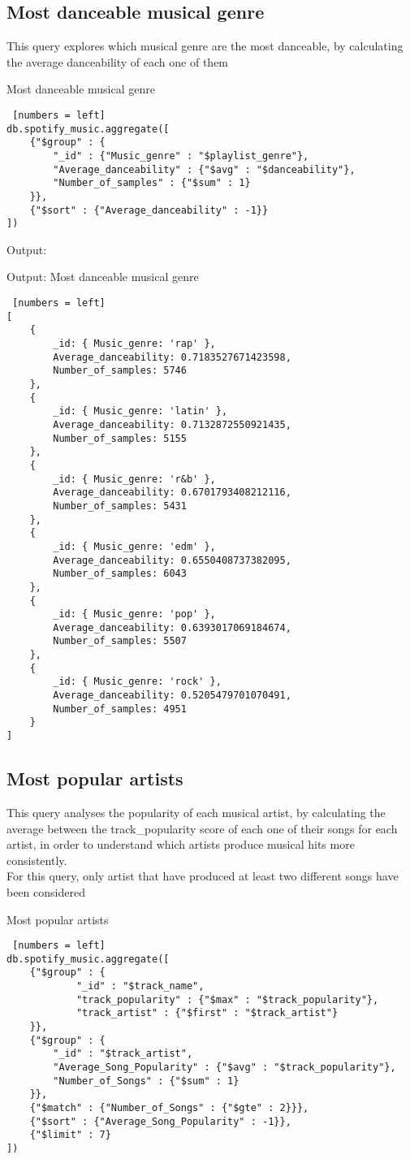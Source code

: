 \documentclass{Configuration_Files/PoliMi3i_thesis}
\begin{document}
\subsection{Most danceable musical genre}
This query explores which musical genre are the most danceable, by calculating the average danceability of each one of them\\
\begin{algorithm}[ht]
\caption{Most danceable musical genre}
\begin{lstlisting} [numbers = left]
db.spotify_music.aggregate([
	{"$group" : {
		"_id" : {"Music_genre" : "$playlist_genre"},
		"Average_danceability" : {"$avg" : "$danceability"},
		"Number_of_samples" : {"$sum" : 1}
	}},
  	{"$sort" : {"Average_danceability" : -1}}
])
\end{lstlisting}
\end{algorithm}
\newpage

Output:
\begin{algorithm}[ht]
\caption{Output: Most danceable musical genre}
\begin{lstlisting} [numbers = left]
[
	{
		_id: { Music_genre: 'rap' },
		Average_danceability: 0.7183527671423598,
		Number_of_samples: 5746
	},
	{
		_id: { Music_genre: 'latin' },
		Average_danceability: 0.7132872550921435,
		Number_of_samples: 5155
	},
	{
		_id: { Music_genre: 'r&b' },
		Average_danceability: 0.6701793408212116,
		Number_of_samples: 5431
	},
	{
		_id: { Music_genre: 'edm' },
		Average_danceability: 0.6550408737382095,
		Number_of_samples: 6043
	},
	{
		_id: { Music_genre: 'pop' },
		Average_danceability: 0.6393017069184674,
		Number_of_samples: 5507
	},
	{
		_id: { Music_genre: 'rock' },
		Average_danceability: 0.5205479701070491,
		Number_of_samples: 4951
	}
]
\end{lstlisting}
\end{algorithm}
\newpage
\subsection{Most popular artists}
This query analyses the popularity of each musical artist, by calculating the average between the track\_popularity score of each one of their songs for each artist, in order to understand which artists produce musical hits more consistently.\\
For this query, only artist that have produced at least two different songs have been considered
\begin{algorithm}[ht]
\caption{Most popular artists}
\begin{lstlisting} [numbers = left]
db.spotify_music.aggregate([
	{"$group" : {
			"_id" : "$track_name",
			"track_popularity" : {"$max" : "$track_popularity"},
			"track_artist" : {"$first" : "$track_artist"}
	}},
	{"$group" : {
		"_id" : "$track_artist",
		"Average_Song_Popularity" : {"$avg" : "$track_popularity"},
		"Number_of_Songs" : {"$sum" : 1}
	}},
	{"$match" : {"Number_of_Songs" : {"$gte" : 2}}},
	{"$sort" : {"Average_Song_Popularity" : -1}},
	{"$limit" : 7}
])
\end{lstlisting}
\end{algorithm}
\newpage
\end{document}
